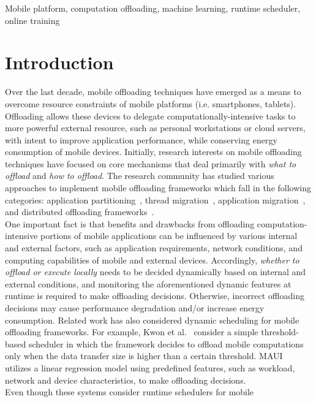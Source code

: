 \documentclass[10pt, conference, compsocconf]{IEEEtran}
\begin{document}
\begin{IEEEkeywords}
Mobile platform, computation offloading, machine learning, runtime
scheduler, online training
\end{IEEEkeywords}

\section{Introduction}
%
Over the last decade, mobile offloading techniques have emerged as
a means to overcome resource constraints of mobile platforms (i.e.
smartphones, tablets).
%
Offloading allows these devices to delegate computationally-intensive
tasks to more powerful external resource, such as personal workstations
or cloud servers, with intent to improve application performance,
while conserving energy consumption of mobile devices.
%
Initially, research interests on mobile offloading techniques
have focused on core mechanisms that deal primarily with \textit{what to
offload} and \textit{how to offload}.
%
The research community has studied various approaches to implement mobile
offloading frameworks which fall in the following categories:
application partitioning~\cite{maui, cuckoo, spectra}, thread
migration~\cite{clonecloud, comet}, application migration~\cite{hung},
and distributed offloading frameworks~\cite{serendipity, mmr}.\\
%
\indent One important fact is that benefits and drawbacks
from offloading computation-intensive portions of mobile applications
can be influenced by various internal and external factors, such as
application requirements, network conditions, and computing
capabilities of mobile and external devices. 
%
Accordingly, \textit{whether to offload or execute locally} needs to be
decided dynamically based on internal and external
conditions, and monitoring the aforementioned dynamic features at
runtime is required to make offloading decisions.
%
Otherwise, incorrect offloading decisions may cause performance
degradation and/or increase energy consumption.
%
Related work has also considered dynamic scheduling for mobile
offloading frameworks.
%
For example, Kwon et al.~\cite{kwon} consider a simple threshold-based
scheduler in which the framework decides to offload  mobile
computations only when the data transfer size is higher than a certain
threshold.
%
MAUI~\cite{maui} utilizes a linear regression model using predefined
features, such as workload, network and device characteristics, to make
offloading decisions.\\
%
\indent Even though these systems consider runtime schedulers for mobile
\end{document}
